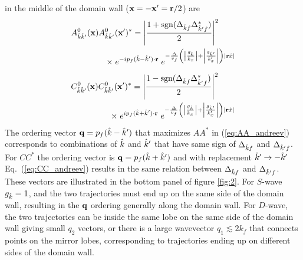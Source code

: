 \documentclass[prb,aps,showpacs,amsmath,twocolumn,10pt]{revtex4-1}
\newcommand{\sign}{\mbox{sgn}}
\begin{document}
in the middle of the domain wall (${\bf x}=-{\bf x}'={\bf r}/2$) are 
\begin{align} 
\label{eq:AA_andreev}
\begin{split}
A^0_{\hk\hk'}(\vx) A^{0}_{\hk\hk'}(\vx')^* 
= \left|\frac{1 + \sign( \Delta_{\hk f } \Delta^*_{\hk' f } )}{2}\right|^2 \qquad 
\\
\times \; e^{-ip_f(\hk-\hk')\cdot\vr}  \; 
e^{- \frac{\Delta}{v_f} \left( \left| \frac{g_{\hk}}{\hk_x} \right| +  \left| \frac{g_{\hk'}}{\hk'_x} \right|\right) 
 | \vr\hx|}
\end{split}\end{align}
%
\begin{align} 
\label{eq:CC_andreev}
\begin{split}
C^0_{\hk\hk'}(\vx) C^{0}_{\hk\hk'}(\vx')^* 
= \left|\frac{1 - \sign( \Delta_{\hk f } \Delta^*_{\hk' f } )}{2}\right|^2 \qquad
\\
\times \; e^{ip_f(\hk+\hk')\cdot\vr}  \; 
e^{- \frac{\Delta}{v_f} \left( \left| \frac{g_{\hk}}{\hk_x} \right| +  \left| \frac{g_{\hk'}}{\hk'_x} \right|\right) 
 | \vr\hx|}
\end{split}\end{align}
The ordering vector ${\bf q}= p_f(\hat{k}-\hat{k}') $ that maximizes $AA^*$ in (\ref{eq:AA_andreev}) 
corresponds to combinations of $\hat{k}$ and $\hat{k}'$ that 
have same sign of $\Delta_{\hat{k} f }$ and $\Delta_{\hat{k}' f }$. 
For $CC^*$ the ordering vector is ${\bf q} = p_f(\hat{k}+\hat{k}')$ and with replacement $\hat{k}' \to -\hat{k}'$ 
Eq.~(\ref{eq:CC_andreev}) results in the same relation between $\Delta_{\hat{k} f }$ and $\Delta_{\hat{k}' f }$. 
These vectors are illustrated in the bottom panel of figure \ref{fig:2}. 
For $S$-wave $g_{\hat{k}}=1$, and the two trajectories must end up on the same side of the domain wall, 
resulting in the ${\bf q}$ ordering generally along the domain wall. For $D$-wave, the two trajectories 
can be inside the same lobe on the same side of the domain wall giving small $q_2$ vectors, 
or there is a large wavevector $q_1 \lesssim 2 k_f$ that connects points on the mirror lobes, 
corresponding to trajectories ending up on different sides of the domain wall. 
\end{document}
